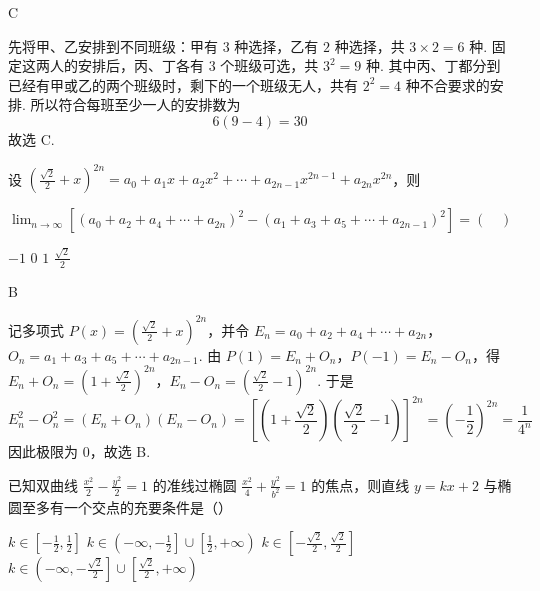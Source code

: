 \begin{answer}
C
\end{answer}

\begin{solution}
先将甲、乙安排到不同班级：甲有 \(3\) 种选择，乙有 \(2\) 种选择，共 \(3\times2=6\) 种. 固定这两人的安排后，丙、丁各有 \(3\) 个班级可选，共 \(3^{2}=9\) 种. 其中丙、丁都分到已经有甲或乙的两个班级时，剩下的一个班级无人，共有 \(2^{2}=4\) 种不合要求的安排. 所以符合每班至少一人的安排数为
\[
6\left(9-4\right)=30
\]
故选 C.
\end{solution}

\begin{problem}
设 \(\left(\frac{\sqrt{2}}{2} + x\right)^{2n} = a_0 + a_1x + a_2x^2 + \cdots + a_{2n-1}x^{2n-1} + a_{2n}x^{2n}\)，则

\(\displaystyle\lim_{n\to \infty}\left[(a_0 + a_2 + a_4 + \cdots + a_{2n})^2 - (a_1 + a_3 + a_5 + \cdots + a_{2n-1})^2\right] = (\quad)\)

\choices
    {\(-1\)}
    {\(0\)}
    {\(1\)}
    {\(\frac{\sqrt{2}}{2}\)}
\end{problem}

\begin{answer}
B
\end{answer}

\begin{solution}
记多项式 \(P(x)=(\frac{\sqrt2}{2}+x)^{2n}\)，并令
\(E_n=a_0+a_2+a_4+\cdots+a_{2n}\)，\(O_n=a_1+a_3+a_5+\cdots+a_{2n-1}\).
由 \(P(1)=E_n+O_n\)，\(P(-1)=E_n-O_n\)，得
\(E_n+O_n=\left(1+\frac{\sqrt2}{2}\right)^{2n}\)，\(E_n-O_n=\left(\frac{\sqrt2}{2}-1\right)^{2n}\).
于是
\[
E_n^2-O_n^2=(E_n+O_n)(E_n-O_n)=\left[\left(1+\frac{\sqrt2}{2}\right)\left(\frac{\sqrt2}{2}-1\right)\right]^{2n}=\left(-\frac12\right)^{2n}=\frac1{4^n}
\]
因此极限为 \(0\)，故选 B.
\end{solution}

\begin{problem}
已知双曲线 \(\frac{x^{2}}{2}-\frac{y^{2}}{2}=1\) 的准线过椭圆 \(\frac{x^{2}}{4}+\frac{y^{2}}{b^{2}}=1\) 的焦点，则直线 \(y=kx+2\) 与椭圆至多有一个交点的充要条件是（\quad）

\choices
    {\(k \in \left[-\frac{1}{2}, \frac{1}{2}\right]\)}
    {\(k \in \left(-\infty, -\frac{1}{2}\right] \cup \left[\frac{1}{2}, +\infty\right)\)}
    {\(k \in \left[-\frac{\sqrt{2}}{2}, \frac{\sqrt{2}}{2}\right]\)}
    {\(k \in \left(-\infty, -\frac{\sqrt{2}}{2}\right] \cup \left[\frac{\sqrt{2}}{2}, +\infty\right)\)}
\end{problem}

